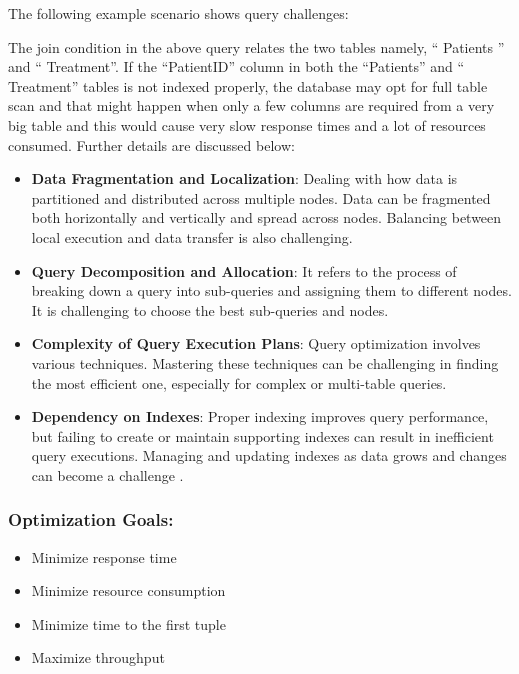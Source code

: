  The following example scenario shows query challenges:



The join condition in the above query relates the two tables namely, `` Patients '' and `` Treatment''. If the ``PatientID'' column in both the ``Patients'' and `` Treatment'' tables  is not indexed properly, the database may opt for full table scan and that might happen when only a few columns are required from a very big table and this would cause very slow response times and a lot of resources consumed. Further details are discussed below:

\begin{itemize}
    \item\textbf{Data Fragmentation and Localization}: Dealing with how data is partitioned and distributed across multiple nodes. Data can be fragmented both horizontally and vertically and spread across nodes. Balancing between local execution and data transfer is also challenging. 
    \item\textbf{Query Decomposition and Allocation}: It refers to the process of breaking down a query into sub-queries and assigning them to different nodes. It is challenging to choose the best sub-queries and nodes.
    \item\textbf{Complexity of Query Execution Plans}: Query optimization involves various techniques. Mastering these techniques can be challenging in finding the most efficient one, especially for complex or multi-table queries.
    \item\textbf{Dependency on Indexes}: Proper indexing improves query performance, but failing to create or maintain supporting indexes can result in inefficient query executions. Managing and updating indexes as data grows and changes can become a challenge \cite{team-2020,etutorials-03-2024,editor-ijmter-2015}.
\end{itemize}
\subsubsection*{Optimization Goals:}

\begin{itemize}
    \item Minimize response time
    \item Minimize resource consumption
    \item Minimize time to the first tuple
    \item Maximize throughput
\end{itemize}\vspace{.4cm}

